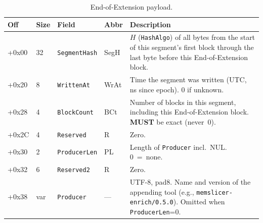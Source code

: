 \documentclass[11pt,a4paper]{article}
\newcommand{\MUST}{\textbf{MUST}}
\newcommand{\field}[1]{\texttt{#1}}
\begin{document}
\begin{table}[H]\centering\caption{End-of-Extension payload.}\label{tab:eox}\small
\begin{tabular}{M M l l p{5.5cm}}\toprule\textbf{Off}&\textbf{Size}&\textbf{Field}&\textbf{Abbr}&\textbf{Description}\\\midrule
+0x00 & 32 & \field{SegmentHash} & SegH & $H$ (\field{HashAlgo}) of all bytes from the start of this segment's first block through the last byte before this End-of-Extension block. \\
+0x20 & 8 & \field{WrittenAt} & WrAt & Time the segment was written (UTC, ns since epoch). 0 if unknown. \\
+0x28 & 4 & \field{BlockCount} & BCt & Number of blocks in this segment, including this End-of-Extension block. \MUST{} be exact (never~0). \\
+0x2C & 4 & \field{Reserved} & R & Zero. \\
+0x30 & 2 & \field{ProducerLen} & PL & Length of \field{Producer} incl.\ NUL. 0~=~none. \\
+0x32 & 6 & \field{Reserved2} & R & Zero. \\
+0x38 & var & \field{Producer} & --- & UTF-8, pad8. Name and version of the appending tool (e.g., \texttt{memslicer-enrich/0.5.0}). Omitted when \field{ProducerLen}=0. \\\bottomrule
\end{tabular}\end{table}
\end{document}
